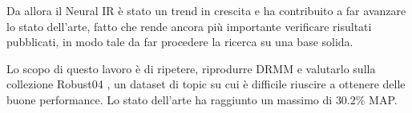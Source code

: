 Da allora il Neural IR è stato un trend in crescita e ha contribuito a far avanzare lo stato dell'arte, fatto che rende ancora più importante verificare risultati pubblicati, in modo tale da far procedere la ricerca su una base solida.

Lo scopo di questo lavoro è di ripetere, riprodurre DRMM e valutarlo sulla collezione Robust04 \cite{rob04}, un dataset di topic su cui è difficile riuscire a ottenere delle buone performance. Lo stato dell'arte ha raggiunto un massimo di $30.2 \%$ MAP.
